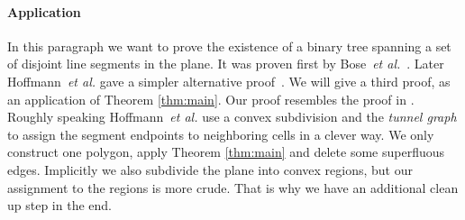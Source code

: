 \documentclass[12pt]{article}
\begin{document}
\paragraph{Application}In this paragraph we want to prove the existence of a binary tree spanning a set of disjoint line segments in the plane.
It was proven first by Bose~\emph{et al.}~\cite{DBLP:journals/dcg/BoseHT01}. Later Hoffmann~\emph{et al.} gave a simpler alternative proof~\cite{Hoffmann201035}. We will give a third proof, as an application of Theorem \ref{thm:main}. Our proof resembles the proof in \cite{Hoffmann201035}. Roughly speaking Hoffmann~\emph{et al.} use a convex subdivision and the \emph{tunnel graph} to assign the segment endpoints to neighboring cells in a clever way. We only construct one polygon, apply Theorem \ref{thm:main} and delete some superfluous edges. Implicitly we also subdivide the plane into convex regions, but our assignment to the regions is more crude. That is why we have an additional clean up step in the end.
\end{document}
